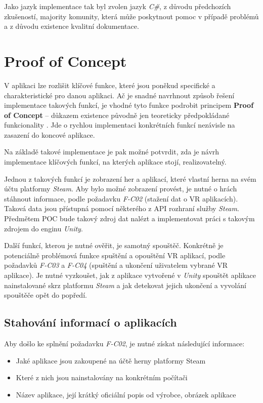 Jako jazyk implementace tak byl zvolen jazyk \emph{C\#}, z důvodu
předchozích zkušeností, majority komunity, která může poskytnout pomoc v
případě problémů a z důvodu existence kvalitní dokumentace.

\section{Proof of Concept}\label{proof-of-concept}

V aplikaci lze rozlišit klíčové funkce, které jsou poněkud specifické a
charakteristické pro danou aplikaci. Ač je snadné navrhnout způsob
řešení implementace takových funkcí, je vhodné tyto funkce podrobit
principem \textbf{Proof of Concept} -- důkazem existence původně jen
teoreticky předpokládané funkcionality \autocite{proofofconcept}. Jde o rychlou implementaci
konkrétních funkcí nezávisle na zasazení do koncové aplikace.

Na základě takové implementace je pak možné potvrdit, zda je návrh
implementace klíčových funkcí, na kterých aplikace stojí,
realizovatelný.

Jednou z takových funkcí je zobrazení her a aplikací, které vlastní herna na svém
účtu platformy \emph{Steam}. Aby bylo možné zobrazení provést, je nutné
o hrách stáhnout informace, podle požadavku \emph{F-C02} (stažení dat o
VR aplikacích). Taková data jsou přístupná pomocí některého z API
rozhraní služby \emph{Steam}. Předmětem POC bude takový zdroj dat nalézt
a implementovat práci s takovým zdrojem do enginu \emph{Unity}.

Další funkcí, kterou je nutné ověřit, je samotný spouštěč. Konkrétně
je potenciálně problémová funkce spuštění a opouštění VR aplikací, podle
požadavků \emph{F-C03} a \emph{F-C04} (spuštění a ukončení uživatelem
vybrané VR aplikace). Je nutné vyzkoušet, jak z aplikace vytvořené v
\emph{Unity} spouštět aplikace nainstalované skrz platformu \emph{Steam}
a jak detekovat jejich ukončení a vyvolání spouštěče opět do popředí.

\subsection{Stahování informací o
aplikacích}\label{stahovuxe1nuxed-informacuxed-o-aplikacuxedch}

Aby došlo ke splnění požadavku \emph{F-C02}, je nutné získat následující
informace:

\begin{itemize}
\tightlist
\item
  Jaké aplikace jsou zakoupené na účtě herny platformy Steam
\item
  Které z nich jsou nainstalovány na konkrétním počítači
\item
  Název aplikace, její krátký oficiální popis od výrobce, obrázek
  aplikace
\end{itemize}

